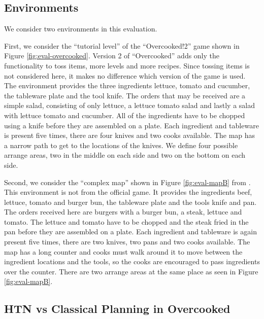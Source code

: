 \subsection{Environments}

We consider two environments in this evaluation.



First, we consider the ``tutorial level'' of the ``Overcooked!2'' game shown in Figure \ref{fig:eval-overcooked}.
Version 2 of ``Overcooked'' adds only the functionality to toss items, more levels and more recipes.
Since tossing items is not considered here, it makes no difference which version of the game is used.
The environment provides the three ingredients lettuce, tomato and cucumber, the tableware plate and the tool knife.
The orders that may be received are a simple salad, consisting of only lettuce, a lettuce tomato salad and lastly a salad with lettuce tomato and cucumber.
All of the ingredients have to be chopped using a knife before they are assembled on a plate.
Each ingredient and tableware is present five times, there are four knives and two cooks available.
The map has a narrow path to get to the locations of the knives.
We define four possible arrange areas, two in the middle on each side and two on the bottom on each side.


Second, we consider the ``complex map'' shown in Figure \ref{fig:eval-mapB} from \cite{yuxinliuPlanningOvercookedGame2020}.
This environment is not from the official game.
It provides the ingredients beef, lettuce, tomato and burger bun, the tableware plate and the tools knife and pan.
The orders received here are burgers with a burger bun, a steak, lettuce and tomato.
The lettuce and tomato have to be chopped and the steak fried in the pan before they are assembled on a plate.
Each ingredient and tableware is again present five times, there are two knives, two pans and two cooks available.
The map has a long counter and cooks must walk around it to move between the ingredient locations and the tools, so the cooks are encouraged to pass ingredients over the counter.
There are two arrange areas at the same place as seen in Figure \ref{fig:eval-mapB}. 

\subsection{HTN vs Classical Planning in Overcooked}


